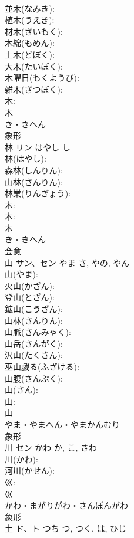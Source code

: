 \documentclass[8pt]{extreport}
\begin{document}
\begin{CJK}{UTF8}{min}
\\	並木(なみき): 
\\	植木(うえき): 
\\	材木(ざいもく): 
\\	木綿(もめん): 
\\	土木(どぼく): 
\\	大木(たいぼく): 
\\	木曜日(もくようび): 
\\	雑木(ざつぼく): 
\\	木: 
\\	木	
\\	き・きへん	
\\	象形 
\\	林	リン	はやし	し	
\\	林(はやし): 
\\	森林(しんりん): 
\\	山林(さんりん): 
\\	林業(りんぎょう): 
\\	木: 
\\	木: 
\\	木	
\\	き・きへん	
\\	会意 
\\	山	サン、セン	やま	さ, やの, やん	
\\	山(やま): 
\\	火山(かざん): 
\\	登山(とざん): 
\\	鉱山(こうざん): 
\\	山林(さんりん): 
\\	山脈(さんみゃく): 
\\	山岳(さんがく): 
\\	沢山(たくさん): 
\\	巫山戯る(ふざける): 
\\	山腹(さんぷく): 
\\	山(さん): 
\\	山: 
\\	山	
\\	やま・やまへん・やまかんむり	
\\	象形 
\\	川	セン	かわ	か, こ, さわ	
\\	川(かわ): 
\\	河川(かせん): 
\\	巛: 
\\	巛	
\\	かわ・まがりがわ・さんぼんがわ	
\\	象形 
\\	土	ド、ト	つち	つ, つく, は, ひじ	

\end{CJK}
\end{document}

